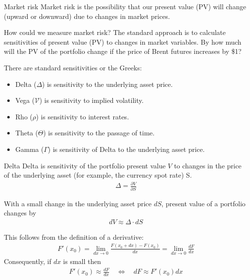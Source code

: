 \documentclass{beamer}
\begin{document}
\begin{frame}{Market risk}
\justify
\alert{Market risk} is the possibility that our present value (PV) will change (upward or downward) due to changes in market prices.

\justify
How could we  measure market risk? The standard approach is to calculate sensitivities of present value (PV) to changes in market variables. By how much will the PV of the portfolio change if the price of Brent futures increases by \$1?

\justify
There are standard sensitivities or the Greeks:
\begin{itemize}
\item Delta ($\Delta$) is sensitivity to the underlying asset price.
\item Vega ($\mathcal{V}$) is sensitivity to implied volatility.
\item Rho ($\rho$) is sensitivity to interest rates.
\item Theta ($\Theta$) is sensitivity to the passage of time.
\item Gamma ($\Gamma$) is sensitivity of Delta to the underlying asset price.
\end{itemize}
\end{frame}



\begin{frame}{Delta}
\justify
\alert{Delta} is sensitivity of the portfolio present value $V$ to changes in the price of the underlying asset (for example, the currency spot rate) S$.$
\begin{align*}
\Delta = \frac{\partial V}{\partial S}
\end{align*}

\justify
With a small change in the underlying asset price $dS$, present value of a portfolio changes by
\begin{align*}
dV \approx \Delta\cdot dS
\end{align*}

\justify
This follows from the definition of a derivative:
\begin{align*}
F'(x_0) = \lim_{dx \to 0} \frac{F(x_0+dx) - F(x_0)}{dx} = \lim_{dx \to 0} \frac{dF}{dx}
\end{align*}
Consequently, if $dx$ is small then
\begin{align*}
F'(x_0) \approx \frac{dF}{dx} \quad \Leftrightarrow \quad dF \approx F'(x_0)dx
\end{align*}
\end{frame}
\end{document}
